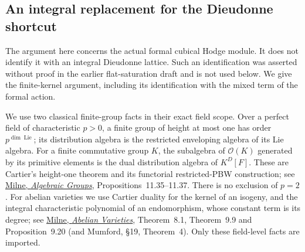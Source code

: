 \subsection{An integral replacement for the Dieudonne shortcut}
\label{subsec:sr-formal-hodge-kernel-repair}

The argument here concerns the actual formal cubical Hodge module.
It does not identify it with an integral Dieudonne lattice.
Such an identification was asserted without proof in the earlier
flat-saturation draft and is not used below.
We give the finite-kernel argument, including its identification
with the mixed term of the formal action.

We use two classical finite-group facts in their exact field
scope.  Over a perfect field of characteristic \(p>0\), a finite
group of height at most one has order \(p^{\dim\operatorname{Lie}}\);
its distribution algebra is the restricted enveloping algebra
of its Lie algebra.  For a finite commutative group \(K\), the
subalgebra of \(\mathcal O(K)\) generated by its primitive
elements is the dual distribution algebra of \(K^D[F]\).
These are Cartier's height-one theorem and its functorial
restricted-PBW construction; see
\href{https://www.jmilne.org/math/Books/iAG2022.pdf}
{Milne, \emph{Algebraic Groups}}, Propositions~11.35--11.37.
There is no exclusion of \(p=2\).
For abelian varieties we use Cartier duality for the kernel of
an isogeny, and the integral characteristic polynomial of an
endomorphism, whose constant term is its degree; see
\href{https://www.jmilne.org/math/CourseNotes/AV110.pdf}
{Milne, \emph{Abelian Varieties}}, Theorem~8.1, Theorem~9.9 and Proposition~9.20
(and Mumford, \S19, Theorem~4).
Only these field-level facts are imported.

